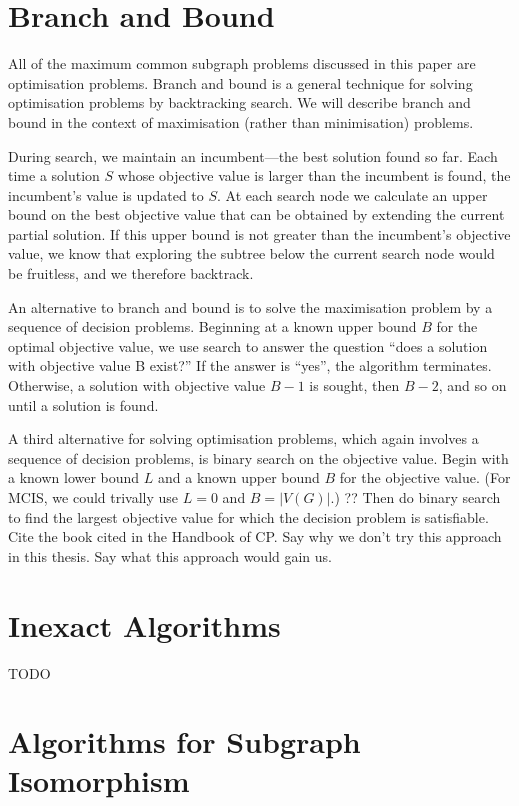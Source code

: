 \section{Branch and Bound}

All of the maximum common subgraph problems discussed in this paper are
optimisation problems.  Branch and bound is a general technique for solving
optimisation problems by backtracking search. We will describe branch and bound
in the context of maximisation (rather than minimisation) problems.

During search, we maintain an incumbent---the best solution found so far. Each
time a solution $S$ whose objective value is larger than the incumbent is found,
the incumbent’s value is updated to $S$. At each search node we calculate an
upper bound on the best objective value that can be obtained by extending the
current partial solution. If this upper bound is not greater than the
incumbent’s objective value, we know that exploring the subtree below the
current search node would be fruitless, and we therefore backtrack.

An alternative to branch and bound is to solve the maximisation problem by a
sequence of decision problems. Beginning at a known upper bound $B$ for the
optimal objective value, we use search to answer the question “does a solution
with objective value B exist?” If the answer is “yes”, the algorithm
terminates. Otherwise, a solution with objective value $B-1$ is sought, then $B-2$,
and so on until a solution is found.

A third alternative for solving optimisation problems, which again involves a
sequence of decision problems, is binary search on the objective value. Begin
with a known lower bound $L$ and a known upper bound $B$ for the objective value.
(For MCIS, we could trivally use $L=0$ and $B=|V(G)|$.) ?? Then do binary search to
find the largest objective value for which the decision problem is satisfiable.
Cite the book cited in the Handbook of CP. Say why we don’t try this approach
in this thesis.  Say what this approach would gain us.

\section{Inexact Algorithms}

TODO

\section{Algorithms for Subgraph Isomorphism} 

